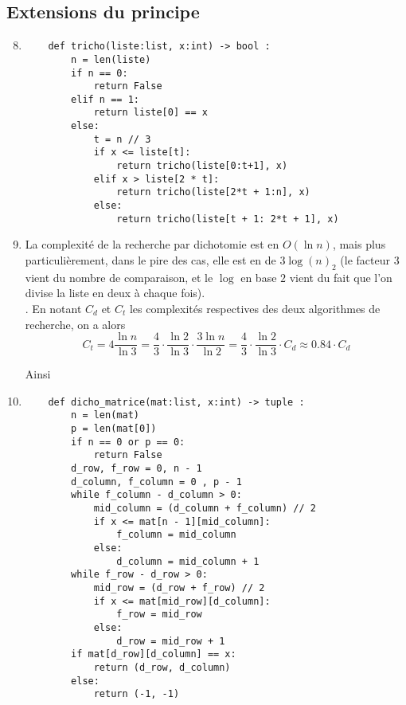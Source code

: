 \documentclass{article}
\begin{document}
\subsection{Extensions du principe}

\begin{enumerate}
    \setcounter{enumi}{7}

    \item \begin{verbatim}
    def tricho(liste:list, x:int) -> bool :
        n = len(liste)
        if n == 0:
            return False 
        elif n == 1:
            return liste[0] == x
        else:
            t = n // 3
            if x <= liste[t]:
                return tricho(liste[0:t+1], x)
            elif x > liste[2 * t]:
                return tricho(liste[2*t + 1:n], x)
            else:
                return tricho(liste[t + 1: 2*t + 1], x)
    \end{verbatim}
    
    \item La complexité de la recherche par dichotomie est en $O(\ln n)$, mais plus particulièrement, dans le pire des cas, elle est en de $3\log(n)_2$ (le facteur $3$ vient du nombre de comparaison, et le $\log$ en base $2$ vient du fait que l'on divise la liste en deux à chaque fois). \\
    . En notant $C_d$ et $C_t$ les complexités respectives des deux algorithmes de recherche, on a alors $$C_t = 4 \frac{\ln n}{\ln 3} = \frac{4}{3} \cdot \frac{\ln 2}{\ln 3} \cdot \frac{3\ln n}{\ln 2} = \frac{4}{3} \cdot \frac{\ln 2}{\ln 3} \cdot C_d \approx 0.84 \cdot C_d$$

    Ainsi 

    \item \begin{verbatim}
    def dicho_matrice(mat:list, x:int) -> tuple :
        n = len(mat)
        p = len(mat[0])
        if n == 0 or p == 0:
            return False
        d_row, f_row = 0, n - 1
        d_column, f_column = 0 , p - 1
        while f_column - d_column > 0:
            mid_column = (d_column + f_column) // 2
            if x <= mat[n - 1][mid_column]:
                f_column = mid_column
            else:
                d_column = mid_column + 1
        while f_row - d_row > 0:
            mid_row = (d_row + f_row) // 2
            if x <= mat[mid_row][d_column]:
                f_row = mid_row
            else:
                d_row = mid_row + 1
        if mat[d_row][d_column] == x:
            return (d_row, d_column)
        else:
            return (-1, -1)     
    \end{verbatim}
\end{enumerate}
\end{document}
